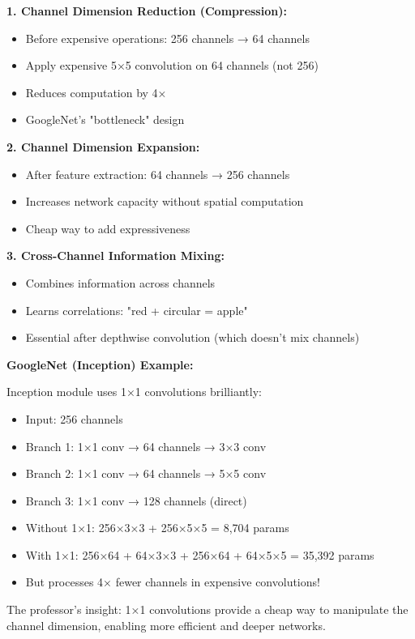 \documentclass[12pt]{article}
\newcommand{\explanation}[1]{{\color{explanationcolor}#1}}
\begin{document}
\begin{enumerate}[(a)]
{    \explanation{
    \textbf{1. Channel Dimension Reduction (Compression):}
    \begin{itemize}
        \item Before expensive operations: 256 channels → 64 channels
        \item Apply expensive 5×5 convolution on 64 channels (not 256)
        \item Reduces computation by 4×
        \item GoogleNet's "bottleneck" design
    \end{itemize}
    
    \textbf{2. Channel Dimension Expansion:}
    \begin{itemize}
        \item After feature extraction: 64 channels → 256 channels
        \item Increases network capacity without spatial computation
        \item Cheap way to add expressiveness
    \end{itemize}
    
    \textbf{3. Cross-Channel Information Mixing:}
    \begin{itemize}
        \item Combines information across channels
        \item Learns correlations: "red + circular = apple"
        \item Essential after depthwise convolution (which doesn't mix channels)
    \end{itemize}
    }
    
    \textbf{GoogleNet (Inception) Example:}
    
    \explanation{
    Inception module uses 1×1 convolutions brilliantly:
    \begin{itemize}
        \item Input: 256 channels
        \item Branch 1: 1×1 conv → 64 channels → 3×3 conv
        \item Branch 2: 1×1 conv → 64 channels → 5×5 conv
        \item Branch 3: 1×1 conv → 128 channels (direct)
        \item Without 1×1: 256×3×3 + 256×5×5 = 8,704 params
        \item With 1×1: 256×64 + 64×3×3 + 256×64 + 64×5×5 = 35,392 params
        \item But processes 4× fewer channels in expensive convolutions!
    \end{itemize}
    
    The professor's insight: 1×1 convolutions provide a cheap way to manipulate the channel dimension, enabling more efficient and deeper networks.
    }
    }
\end{enumerate}
\end{document}
